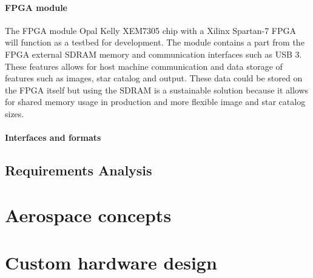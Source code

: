 \documentclass[12pt]{report}
\begin{document}
\subsubsection{FPGA module}
The FPGA module Opal Kelly XEM7305 chip with a Xilinx Spartan-7 FPGA will function as a testbed for development. The module contains a part from the FPGA external SDRAM memory and communication interfaces such as USB 3. These features allows for host machine communication and data storage of features such as images, star catalog and output. These data could be stored on the FPGA itself but using the SDRAM is a sustainable solution because it allows for shared memory usage in production and more flexible image and star catalog sizes.

\subsubsection{Interfaces and formats}

\section{Requirements Analysis}


\chapter{Aerospace concepts}

\chapter{Custom hardware design}
\end{document}
